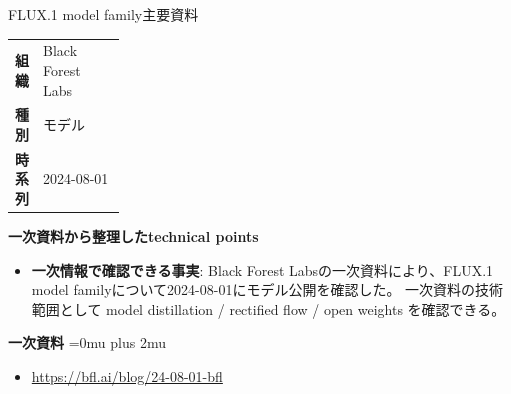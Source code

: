 \begin{technicalnote}{FLUX.1 model family}{主要資料}
\begingroup
\begin{tabularx}{\linewidth}{@{}>{\bfseries}p{0.22\linewidth}X@{}}
組織 & Black Forest Labs \\
種別 & モデル \\
時系列 & 2024-08-01 \\
\end{tabularx}
\smallskip
{\bfseries 一次資料から整理したtechnical points}
\begin{itemize}[leftmargin=1.5em,itemsep=0.35em]
\item \textbf{一次情報で確認できる事実}: Black Forest Labsの一次資料により、FLUX.1 model familyについて2024-08-01にモデル公開を確認した。 一次資料の技術範囲として model distillation / rectified flow / open weights を確認できる。
\end{itemize}
\begin{minipage}{\linewidth}
\begin{samepage}
{\bfseries 一次資料}
\begingroup\sloppy
\Urlmuskip=0mu plus 2mu\relax
\begin{itemize}[leftmargin=1.5em,itemsep=0.25em]
\item {\scriptsize\url{https://bfl.ai/blog/24-08-01-bfl}}
\end{itemize}
\endgroup
\end{samepage}
\end{minipage}
\endgroup
\end{technicalnote}
\medskip

